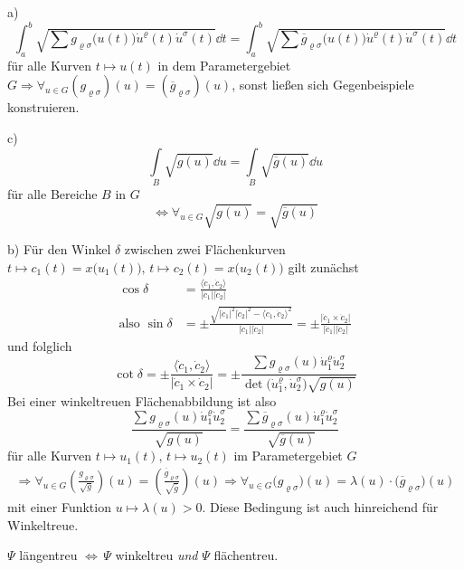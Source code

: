 \begin{beweis}
 \item[a)]
 \[
  \int_a^b \sqrt{\sum g_{\varrho \sigma} \big(u(t)\big) \dot u^{\varrho}(t) \dot u^\sigma (t)} \dd t = \int_a^b \sqrt{\sum \overline g_{\varrho \sigma} \big(u(t)\big) \dot u^\varrho (t) \dot u^\sigma(t)} \dd t
 \]
 für alle Kurven \(t \mapsto u(t)\) in dem Parametergebiet \(G \Rightarrow \forall_{u \in G} (g_{\varrho \sigma})(u) = (\overline g_{\varrho \sigma})(u)\), sonst ließen sich Gegenbeispiele konstruieren.
 \item[c)]
 \[
  \int\limits_B \sqrt{g(u)} \dd u = \int\limits_B \sqrt{\overline g(u)}\dd u
 \]
 für alle Bereiche \(B\) in \(G\)
 \[
  \Leftrightarrow \forall_{u\in G} \sqrt{g(u)} = \sqrt{\overline{g}(u)}
 \]
 \item[b)] Für den Winkel \(\delta\) zwischen zwei Flächenkurven \(t \mapsto c_1(t) = x\big(u_1(t)\big), \, t \mapsto c_2(t) = x\big(u_2(t)\big)\) gilt zunächst
 \begin{align*}
  \cos\delta &= \frac{\langle \dot c_1, \dot c_2\rangle}{|\dot c_1| |\dot c_2|} \\
  \text{also } \sin \delta &= \pm \frac{\sqrt{|\dot c_1|^2 |\dot c_2|^2 - \langle \dot c_1, \dot c_2\rangle^2}}{|\dot c_1||\dot c_2|} = \pm \frac{|\dot c_1 \times \dot c_2|}{|\dot c_1||\dot c_2|}
 \end{align*}
 und folglich
 \[
  \cot \delta = \pm \frac{\langle\dot c_1, \dot c_2\rangle}{|\dot c_1\times \dot c_2|} = \pm \frac{\sum g_{\varrho \sigma}(u) \dot u_1^\varrho \dot u_2^\sigma}{\det\big(\dot u_1^\varrho, \dot u_2^\sigma\big) \sqrt{{g(u)}}}
 \]
 Bei einer winkeltreuen Flächenabbildung ist also
 \[
  \frac{\sum g_{\varrho \sigma} (u) \dot u_1^\varrho \dot u_2^\sigma}{\sqrt{ g(u)}} = \frac{\sum \overline g_{\varrho \sigma} (u) \dot u_1^\varrho \dot u_2^\sigma}{\sqrt{\overline g(u)}}
 \]
 für alle Kurven \(t \mapsto u_1(t), \, t \mapsto u_2(t)\) im Parametergebiet \(G\)
 \begin{align*}
  \Rightarrow \forall_{u \in G} \left(\frac{g_{\varrho \sigma}}{\sqrt{g}}\right)(u) = \left(\frac{\overline g_{\varrho \sigma}}{\sqrt{\overline g}}\right)(u) \Rightarrow \forall_{u \in G} \big(g_{\varrho \sigma}\big)(u) = \lambda(u) \cdot \big(\overline g_{\varrho \sigma}\big)(u)
 \end{align*}
 mit einer Funktion \(u \mapsto \lambda(u) > 0\). Diese Bedingung ist auch hinreichend für Winkeltreue.
\end{beweis}

\begin{folgerung}
  \(\Psi\) längentreu \(\Leftrightarrow \, \Psi\) winkeltreu \textit{und} \(\Psi\) flächentreu.
\end{folgerung}


